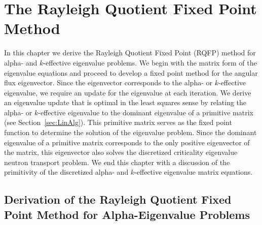 \chapter{The Rayleigh Quotient Fixed Point Method}
\label{ch3}

In this chapter we derive the Rayleigh Quotient Fixed Point (RQFP) method for alpha- and $k$-effective eigenvalue problems. We begin with the matrix form of the eigenvalue equations and proceed to develop a fixed point method for the angular flux eigenvector. Since the eigenvector corresponds to the alpha- or $k$-effective eigenvalue, we require an update for the eigenvalue at each iteration. We derive an eigenvalue update that is optimal in the least squares sense by relating the alpha- or $k$-effective eigenvalue to the dominant eigenvalue of a primitive matrix (see Section~\ref{sec:LinAlg}). This primitive matrix serves as the fixed point function to determine the solution of the eigenvalue problem. Since the dominant eigenvalue of a primitive matrix corresponds to the only positive eigenvector of the matrix, this eigenvector also solves the discretized criticality eigenvalue neutron transport problem. We end this chapter with a discussion of the primitivity of the discretized alpha- and $k$-effective eigenvalue matrix equations.

\section{Derivation of the Rayleigh Quotient Fixed Point Method for Alpha-Eigenvalue Problems}

